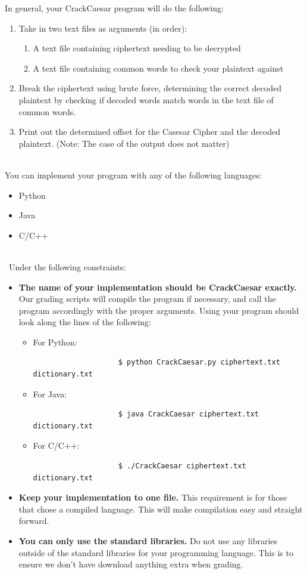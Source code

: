 \documentclass{article}
\begin{document}
\noindent In general, your CrackCaesar program will do the following:
\begin{enumerate}
\item Take in two text files as arguments (in order):
\begin {enumerate}
	\item A text file containing ciphertext needing to be decrypted
	\item A text file containing common words to check your plaintext against
\end{enumerate}
\item Break the ciphertext using brute force, determining the correct decoded plaintext by checking if decoded words match words in the text file of common words.
\item Print out the determined offset for the Casesar Cipher and the decoded plaintext. (Note: The case of the output does not matter)
\end{enumerate}

\noindent \\You can implement your program with any of the following languages:
\begin{itemize}
\item Python
\item Java
\item C/C++
\end{itemize}
\-\\\ Under the following constraints:
\begin{itemize}
\item \textbf{The name of your implementation should be CrackCaesar exactly.} Our grading scripts will compile the program if necessary, and call the program accordingly with the proper arguments. Using your program should look along the lines of the following:
	\begin{itemize}
	\item For Python:
		\begin{verbatim}
			        $ python CrackCaesar.py ciphertext.txt dictionary.txt
		\end{verbatim}
	\item For Java:
		\begin{verbatim}
			        $ java CrackCaesar ciphertext.txt dictionary.txt
		\end{verbatim}
	\item For C/C++:
		\begin{verbatim}
			        $ ./CrackCaesar ciphertext.txt dictionary.txt
		\end{verbatim}
	\end{itemize}
\item \textbf{Keep your implementation to one file.} This requirement is for those that chose a compiled language. This will make compilation easy and straight forward.
\item \textbf{You can only use the standard libraries.} Do not use any libraries outside of the standard libraries for your programming language. This is to ensure we don't have download anything extra when grading.
\end{itemize}
\end{document}
